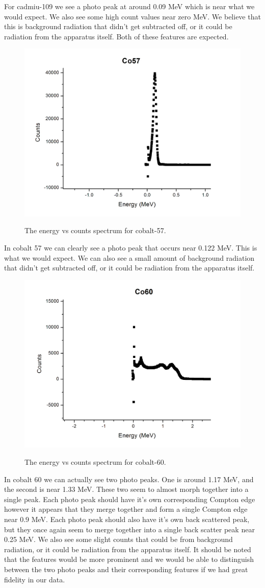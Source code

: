 \documentclass[12pt letterpaper]{article}
\begin{document}
For cadmiu-109 we see a photo peak at around 0.09 MeV which is near what we would expect. We also see some high count values near zero MeV. We believe that this is background radiation that didn't get subtracted off, or it could be radiation from the apparatus itself. Both of these features are expected. 


\begin{figure}[H]
  \caption{The energy vs counts spectrum for cobalt-57.}
  \centering
    \includegraphics[width=.60\textwidth]{co57.JPG}
    \label{fig:co57}
\end{figure}

In cobalt 57 we can clearly see a photo peak that occurs near 0.122 MeV. This is what we would expect. We can also see a small amount of background radiation that didn't get subtracted off, or it could be radiation from the apparatus itself.

\begin{figure}[H]
  \caption{The energy vs counts spectrum for cobalt-60.}
  \centering
    \includegraphics[width=.60\textwidth]{co60.JPG}
    \label{fig:co60}
\end{figure}

In cobalt 60 we can actually see two photo peaks. One is around 1.17 MeV, and the second is near 1.33 MeV. These two seem to almost morph together into a single peak. Each photo peak should have it's own corresponding Compton edge however it appears that they merge together and form a single Compton edge near 0.9 MeV. Each photo peak should also have it's own back scattered peak, but they once again seem to merge together into a single back scatter peak near 0.25 MeV. We also see some slight counts that could be from background radiation, or it could be radiation from the apparatus itself. It should be noted that the features would be more prominent and we would be able to distinguish between the two photo peaks and their corresponding features if we had great fidelity in our data. 
\end{document}
